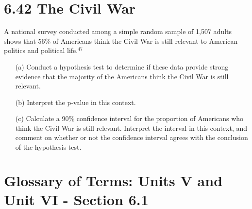 \documentclass{article}
\begin{document}
\section*{6.42 The Civil War}
A national survey conducted among a simple random sample of 1,507 adults shows that 56\% of Americans think the Civil War is still relevant to American politics and political life.\(^{47}\)
\begin{itemize}
    \item[(a)] Conduct a hypothesis test to determine if these data provide strong evidence that the majority of the Americans think the Civil War is still relevant.
    \item[(b)] Interpret the p-value in this context.
    \item[(c)] Calculate a 90\% confidence interval for the proportion of Americans who think the Civil War is still relevant. Interpret the interval in this context, and comment on whether or not the confidence interval agrees with the conclusion of the hypothesis test.
\end{itemize}

\newpage
\section*{Glossary of Terms: Units V and Unit VI - Section 6.1}
\end{document}
